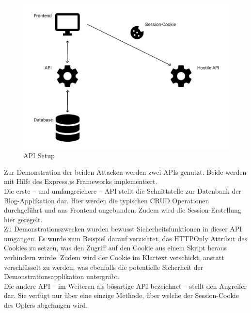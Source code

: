 \begin{figure}
    \includegraphics[width=\linewidth]{img/phase2.png}
    \caption{API Setup}
    \label{fig:api}
\end{figure}
Zur Demonstration der beiden Attacken werden zwei APIs genutzt. Beide werden mit Hilfe des Express.js Frameworks implementiert. \\
Die erste – und umfangreichere – API stellt die Schnittstelle zur Datenbank der Blog-Applikation dar. Hier werden die typischen CRUD Operationen durchgeführt und ans Frontend angebunden. Zudem wird die Session-Erstellung hier geregelt.\\
Zu Demonstrationszwecken wurden bewusst Sicherheitsfunktionen in dieser API umgangen. Es wurde zum Beispiel darauf verzichtet, das HTTPOnly Attribut des Cookies zu setzen, was den Zugriff auf den Cookie aus einem Skript heraus verhindern würde. Zudem wird der Cookie im Klartext verschickt, anstatt verschlüsselt zu werden, was ebenfalls die potentielle Sicherheit der Demonstrationsapplikation untergräbt.\\
Die andere API – im Weiteren als bösartige API bezeichnet – stellt den Angreifer dar. Sie verfügt nur über eine einzige Methode, über welche der Session-Cookie des Opfers abgefangen wird. 
